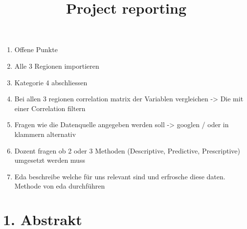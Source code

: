 \documentclass[
  journal,
]{IEEEtran}%
\title{Project reporting}
\author{

}
\providecommand{\tightlist}{%
  \setlength{\itemsep}{0pt}\setlength{\parskip}{0pt}}\usepackage{longtable,booktabs,array}
\begin{document}


\maketitle


%

\ifdefined\Shaded\renewenvironment{Shaded}{\begin{tcolorbox}[interior hidden, borderline west={3pt}{0pt}{shadecolor}, frame hidden, enhanced, sharp corners, boxrule=0pt, breakable]}{\end{tcolorbox}}\fi

\begin{enumerate}
\def\labelenumi{\arabic{enumi}.}
\setcounter{enumi}{-1}
\tightlist
\item
  Offene Punkte
\item
  Alle 3 Regionen importieren
\item
  Kategorie 4 abschliessen
\item
  Bei allen 3 regionen correlation matrix der Variablen vergleichen
  -\textgreater{} Die mit einer Correlation filtern
\item
  Fragen wie die Datenquelle angegeben werden soll -\textgreater{}
  googlen / oder in klammern alternativ
\item
  Dozent fragen ob 2 oder 3 Methoden (Descriptive, Predictive,
  Prescriptive) umgesetzt werden muss
\item
  Eda beschreibe welche für uns relevant sind und erfrosche diese daten.
  Methode von eda durchführen
\end{enumerate}

\hypertarget{abstrakt}{%
\section{1. Abstrakt}\label{abstrakt}}
\end{document}
